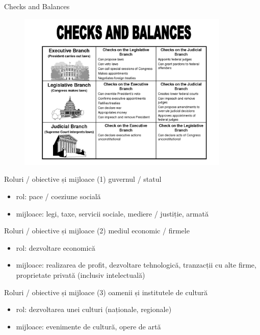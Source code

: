 \documentclass{simple}
\begin{document}
\begin{frame}{Checks and Balances}
  \begin{figure}
    \centering
    \pause
    \includegraphics[width=0.9\textwidth]{img/checks-and-balances.jpg}
  \end{figure}
\end{frame}

\begin{frame}{Roluri / obiective și mijloace (1)}
  guvernul / statul
  \begin{itemize}
    \pause \item rol: pace / coeziune socială
    \pause \item mijloace: legi, taxe, servicii sociale, mediere / justiție, armată
  \end{itemize}
\end{frame}

\begin{frame}{Roluri / obiective și mijloace (2)}
  mediul economic / firmele
  \begin{itemize}
    \pause \item rol: dezvoltare economică
    \pause \item mijloace: realizarea de profit, dezvoltare tehnologică, tranzacții cu alte firme, proprietate privată (inclusiv intelectuală)
  \end{itemize}
\end{frame}

\begin{frame}{Roluri / obiective și mijloace (3)}
  oamenii și institutele de cultură
  \begin{itemize}
    \pause \item rol: dezvoltarea unei culturi (naționale, regionale)
    \pause \item mijloace: evenimente de cultură, opere de artă
  \end{itemize}
\end{frame}
\end{document}
